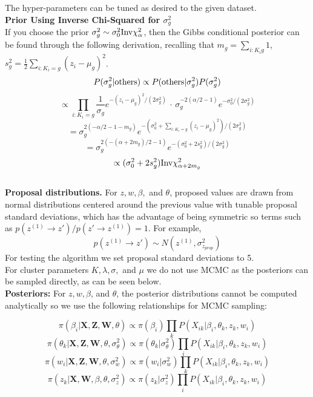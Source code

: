 \documentclass[12pt]{article}
\newcommand{\tx}[1]{\textnormal{#1}}
\begin{document}
The hyper-parameters can be tuned as desired to the given dataset.\\

\textbf{Prior Using Inverse Chi-Squared for $\sigma_g^2$}\\

If you choose the prior $\sigma_g^2\sim \sigma_0^2\tx{Inv}\chi^2_{\alpha}$, then the Gibbs conditional posterior can be found through the following derivation, recalling that $m_g=\sum_{i:K_ig}1$, $s_g^2=\frac{1}{2}\sum_{i:K_i=g}(z_i-\mu_g)^2$. $$P(\sigma_g^2|\tx{others})\propto P(\tx{others}|\sigma_g^2)P(\sigma_g^2)$$ $$\propto\prod_{i:K_i=g}\frac{1}{\sigma_g}e^{-(z_i-\mu_g)^2/(2\sigma_g^2)}\,\cdot\, \sigma_g^{-2(\alpha/2-1)}e^{-\sigma_0^2/(2\sigma_g^2)}$$ $$=\sigma_g^{2(-\alpha/2-1-m_g)}e^{-(\sigma_0^2+\sum_{i:K_i=g}(z_i-\mu_g)^2)/(2\sigma_g^2)}$$ $$=\sigma_g^{2(-(\alpha+2m_g)/2-1)}e^{-(\sigma_0^2+2s_g^2)/(2\sigma_g^2)}$$ $$\propto (\sigma_0^2+2s_g^2)\tx{Inv}\chi^2_{\alpha+2m_g}$$\\
 

\textbf{Proposal distributions.} For $z,w,\beta,$ and  $\theta$, proposed values are drawn from normal distributions centered around the previous value with tunable proposal standard deviations, which has the advantage of being symmetric so terms such as $p(z^{(1)}\rightarrow z')/p(z'\rightarrow z^{(1)})=1$. For example, $$p(z^{(1)}\rightarrow z')\sim N(z^{(1)},\sigma^2_{z_{prop}})$$ For testing the algorithm we set proposal standard deviations to 5.\\

For cluster parameters $K,\lambda,\sigma,$ and $\mu$ we do not use MCMC as the posteriors can be sampled directly, as can be seen below.\\




 \textbf{Posteriors:}  For $z,w,\beta$, and $\theta$, the posterior distributions cannot be computed analytically so we use the following relationships for MCMC sampling:
 
 $$\pi(\beta_i|\textbf{X},\textbf{Z},\textbf{W},\theta)\propto \pi(\beta_i)\prod_{k}P(X_{ik}|\beta_i,\theta_k,z_k,w_i)$$  
  $$\pi(\theta_k|\textbf{X},\textbf{Z},\textbf{W},\theta,\sigma_\theta^2)\propto \pi(\theta_k|\sigma_\theta^2)\prod_{i}P(X_{ik}|\beta_i,\theta_k,z_k,w_i)$$ 
   $$\pi(w_i|\textbf{X},\textbf{Z},\textbf{W},\theta,\sigma_w^2)\propto \pi(w_i|\sigma_w^2)\prod_{k}P(X_{ik}|\beta_i,\theta_k,z_k,w_i)$$ 
    $$\pi(z_k|\textbf{X},\textbf{W},\beta,\theta,\sigma_z^2)\propto \pi(z_k|\sigma_z^2)\prod_{i}P(X_{ik}|\beta_i,\theta_k,z_k,w_i)$$ 
    
\end{document}
